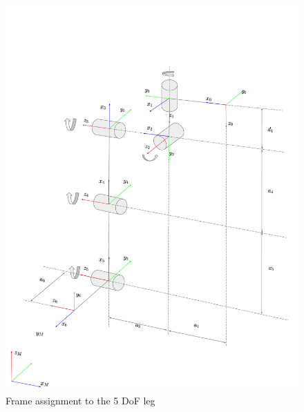 \documentclass[a4paper]{article}
\begin{document}
\begin{figure}
\centering
\includegraphics[scale=0.4]{plot/kinematic/5dof_leg.pdf} 
\caption{Frame assignment to the 5 DoF leg} 
\label{fig:5dof_frame}
\end{figure}
\end{document}
